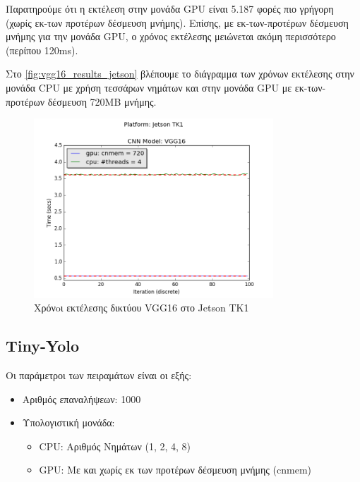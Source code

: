 Παρατηρούμε ότι η εκτέλεση στην μονάδα GPU είναι 5.187 φορές πιο
γρήγορη (χωρίς εκ-των προτέρων δέσμευση μνήμης).
Επίσης, με εκ-των-προτέρων δέσμευση μνήμης για την μονάδα GPU, ο χρόνος εκτέλεσης μειώνεται ακόμη
περισσότερο (περίπου 120ms).

Στο \autoref{fig:vgg16_results_jetson} βλέπουμε το διάγραμμα
των χρόνων εκτέλεσης στην μονάδα CPU με χρήση τεσσάρων νημάτων και στην μονάδα
GPU με εκ-των-προτέρων δέσμευση 720MB μνήμης.

\begin{figure}[!ht]
  \centering
  \includegraphics[width=0.8\textwidth]{./images/chapter6/benchmark_vgg16_jetson.png}
  \caption[Χρόνoι εκτέλεσης δικτύου VGG16 στο Jetson TK1]{Χρόνoι εκτέλεσης δικτύου VGG16 στο Jetson TK1}
  \label{fig:vgg16_results_jetson}
\end{figure}



\subsection{Tiny-Yolo}

Οι παράμετροι των πειραμάτων είναι οι εξής:
\begin{itemize}
  \item{Αριθμός επαναλήψεων: 1000}
  \item{Υπολογιστική μονάδα:}
    \begin{itemize}
      \item{CPU: Αριθμός Νημάτων (1, 2, 4, 8)}
      \item{GPU: Με και χωρίς εκ των προτέρων δέσμευση μνήμης (cnmem)}
    \end{itemize}
\end{itemize}

